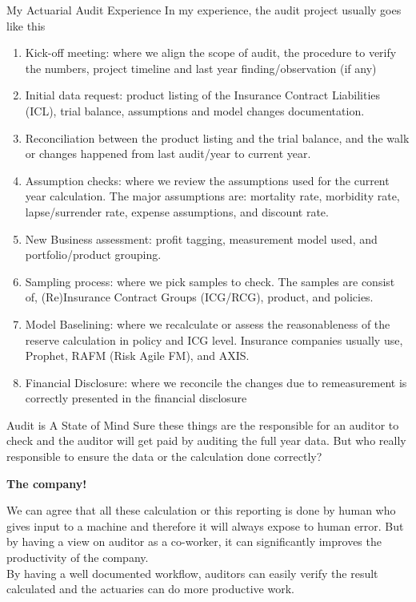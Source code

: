 \documentclass[aspectratio=169]{beamer}
\begin{document}
\begin{frame}[allowframebreaks]{My Actuarial Audit Experience}
In my experience, the audit project usually goes like this \\
\begin{enumerate}
\item Kick-off meeting: where we align the scope of audit, the procedure to verify the numbers, project timeline and last year finding/observation (if any)
\item Initial data request: product listing of the Insurance Contract Liabilities (ICL), trial balance, assumptions and model changes documentation.  
\item Reconciliation between the product listing and the trial balance, and the walk or changes happened from last audit/year to current year.
\item Assumption checks: where we review the assumptions used for the current year calculation. The major assumptions are: mortality rate, morbidity rate, lapse/surrender rate, expense assumptions, and discount rate.
\item New Business assessment: profit tagging, measurement model used, and portfolio/product grouping.
\item Sampling process: where we pick samples to check. The samples are consist of, (Re)Insurance Contract Groups (ICG/RCG), product, and policies.
\item Model Baselining: where we recalculate or assess the reasonableness of the reserve calculation in policy and ICG level. Insurance companies usually use, Prophet, RAFM (Risk Agile FM), and AXIS.  
\item Financial Disclosure: where we reconcile the changes due to remeasurement is correctly presented in the financial disclosure
\end{enumerate}
\end{frame}

\begin{frame}{Audit is A State of Mind}
 Sure these things are the responsible for an auditor to check and the auditor will get paid by auditing the full year data. But who really responsible to ensure the data or the calculation done correctly? 
  \begin{center}
  \textbf{The company!}
  \end{center}   
  We can agree that all these calculation or this reporting is done by human who gives input to a machine and therefore it will always expose to human error. But by having a view on auditor as a co-worker, it can significantly improves the productivity of the company. \\
By having a well documented workflow, auditors can easily verify the result calculated and the actuaries can do more productive work.
\end{frame}
\end{document}
